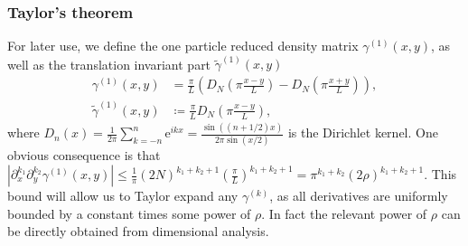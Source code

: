 \documentclass[a4paper,11pt]{article}
\newcommand{\euler}[1]{\text{e}^{#1}}
\newcommand{\abs}[1]{\left\lvert #1 \right\rvert}
\numberwithin{equation}{section}
\begin{document}
	\subsubsection{Taylor's theorem}
	For later use, we define the one particle reduced density matrix $ \gamma^{(1)}(x,y) $, as well as the translation invariant part $ \tilde{\gamma}^{(1)}(x,y) $ \begin{equation}
	\begin{aligned}
	\gamma^{(1)}(x,y)&=\frac{\pi}{L}\left(D_{N}\left(\pi\frac{x-y}{L}\right)-D_{N}\left(\pi\frac{x+y}{L}\right)\right),\\
	\tilde{\gamma}^{(1)}(x,y)&\coloneqq \frac{\pi}{L}D_{N}\left(\pi \frac{x-y}{L}\right),
	\end{aligned}
	\end{equation}
	where $ D_n(x)=\frac{1}{2\pi}\sum_{k=-n}^{n}\euler{ikx}=\frac{\sin((n+1/2)x)}{2\pi\sin(x/2)} $ is the Dirichlet kernel. One obvious consequence is that $ \abs{\partial_{x}^{k_1}\partial_{y}^{k_2}\gamma^{(1)}(x,y)}\leq \frac{1}{\pi}(2N)^{k_1+k_2+1}\left(\frac{\pi}{L}\right)^{k_1+k_2+1}=\pi^{k_1+k_2}(2\rho)^{k_1+k_2+1} $. This bound will allow us to Taylor expand any $ \gamma^{(k)} $, as all derivatives are uniformly bounded by a constant times some power of $ \rho $. In fact the relevant power of $ \rho $ can be directly obtained from dimensional analysis.
\end{document}

